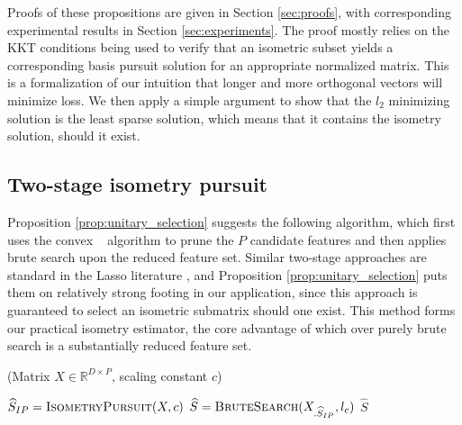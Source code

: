 Proofs of these propositions are given in Section \ref{sec:proofs}, with corresponding experimental results in Section \ref{sec:experiments}.
The proof mostly relies on the KKT conditions \citep{Hastie2015-qa} being used to verify that an isometric subset yields a corresponding basis pursuit solution for an appropriate normalized matrix.
This is a formalization of our intuition that longer and more orthogonal vectors will minimize loss.
We then apply a simple argument to show that the $l_2$ minimizing solution is the least sparse solution, which means that it contains the isometry solution, should it exist.

\subsection{Two-stage isometry pursuit}

Proposition \ref{prop:unitary_selection} suggests the following algorithm, which first uses the convex \isometrypursuit~ algorithm to prune the $P$ candidate features and then applies brute search upon the reduced feature set.
Similar two-stage approaches are standard in the Lasso literature \cite{Hesterberg2008-iy, Koelle2022-ju}, and Proposition \ref{prop:unitary_selection} puts them on relatively strong footing in our application, since this approach is guaranteed to select an isometric submatrix should one exist.
This method forms our practical isometry estimator, the core advantage of which over purely brute search is a substantially reduced feature set.

\begin{algorithm}[H]
\caption{\tsip(Matrix ${X} \in \mathbb{R}^{D \times P}$, scaling constant $c$)}
\begin{algorithmic}[1]
\STATE $\widehat{S}_{IP} = \text{{\sc IsometryPursuit}}( X, c)$
\STATE $\widehat{S} = \text {{\sc BruteSearch}}({X}_{.\widehat{S}_{IP}}, l_c)$
 $\widehat{S}$
\end{algorithmic}
\end{algorithm}

